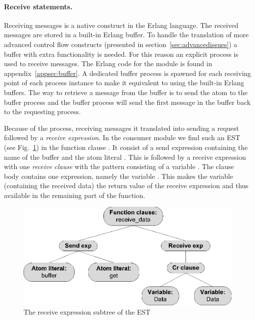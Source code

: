 \paragraph*{Receive statements.}
Receiving messages is a native construct in the Erlang language. The received messages are stored in a built-in Erlang buffer. To handle the translation of more advanced control flow constructs (presented in section~\ref{sec:advancedissues}) a buffer with extra functionality is needed. For this reason an explicit  process is used to receive messages. The Erlang code for the  module is found in appendix~\ref{appsec:buffer}. A dedicated buffer process is spawned for each receiving point of each process instance to make it equivalent to using the built-in Erlang buffers. The way to retrieve a message from the buffer is to send the atom  to the buffer process and the buffer process will send the first message in the buffer back to the requesting process.

Because of the  process, receiving messages it translated into sending a  request followed by a \emph{receive expression}. In the consumer module we find such an EST (see Fig.~\ref{fig:receiveexp}) in the function clause . It consist of a send expression containing the name of the buffer and the atom literal . This is followed by a receive expression with one \emph{receive clause} with the pattern consisting of a variable . The clause body contains one expression, namely the variable . This makes the variable (containing the received data) the return value of the receive expression and thus available in the remaining part of the function.

\begin{figure}[h!]
\centering
\includegraphics[scale=0.7]{translation/ast_to_est/graphics/producerest03.eps}
\caption{The receive expression subtree of the EST}
\label{fig:receiveexp}
\end{figure}

